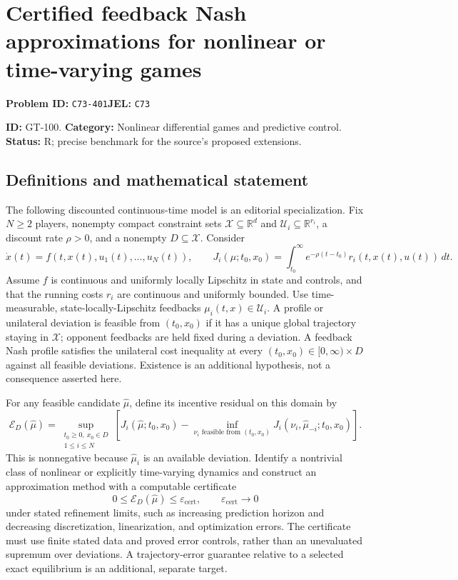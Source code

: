 \documentclass[11pt,a4paper]{article}
\begin{document}
\section*{Certified feedback Nash approximations for nonlinear or time-varying games}
\textbf{Problem ID:} \texttt{C73-401}\quad \textbf{JEL:} \texttt{C73}\par
\label{problem:OP-0230}
\label{game:GT-100}
{\sffamily\small\color{muted}
\noindent\textbf{ID:} GT-100. \textbf{Category:} Nonlinear differential games and predictive control.
\textbf{Status:} R; precise benchmark for the source's proposed extensions.
\par}
\subsection*{Definitions and mathematical statement}
The following discounted continuous-time model is an editorial specialization. Fix $N\geq2$ players, nonempty compact constraint sets $\mathcal X\subseteq\mathbb R^d$ and $\mathcal U_i\subseteq\mathbb R^{r_i}$, a discount rate $\rho>0$, and a nonempty $D\subseteq\mathcal X$. Consider
\[
 \dot x(t)=f(t,x(t),u_1(t),\ldots,u_N(t)),\qquad
 J_i(\mu;t_0,x_0)=\int_{t_0}^\infty e^{-\rho(t-t_0)}
                   r_i(t,x(t),u(t))\,dt.
\]
Assume $f$ is continuous and uniformly locally Lipschitz in state and controls, and that the running costs $r_i$ are continuous and uniformly bounded. Use time-measurable, state-locally-Lipschitz feedbacks $\mu_i(t,x)\in\mathcal U_i$. A profile or unilateral deviation is feasible from $(t_0,x_0)$ if it has a unique global trajectory staying in $\mathcal X$; opponent feedbacks are held fixed during a deviation. A feedback Nash profile satisfies the unilateral cost inequality at every $(t_0,x_0)\in[0,\infty)\times D$ against all feasible deviations. Existence is an additional hypothesis, not a consequence asserted here.

For any feasible candidate $\widehat\mu$, define its incentive residual on this domain by
\[
 \mathcal E_D(\widehat\mu)=
 \sup_{\substack{t_0\geq0,\ x_0\in D\\1\leq i\leq N}}
 \left[J_i(\widehat\mu;t_0,x_0)
   -\inf_{\nu_i\text{ feasible from }(t_0,x_0)}
          J_i(\nu_i,\widehat\mu_{-i};t_0,x_0)\right].
\]
This is nonnegative because $\widehat\mu_i$ is an available deviation. Identify a nontrivial class of nonlinear or explicitly time-varying dynamics and construct an approximation method with a computable certificate
\[
 0\leq\mathcal E_D(\widehat\mu)\leq\varepsilon_{\mathrm{cert}},
 \qquad\varepsilon_{\mathrm{cert}}\longrightarrow0
\]
under stated refinement limits, such as increasing prediction horizon and decreasing discretization, linearization, and optimization errors. The certificate must use finite stated data and proved error controls, rather than an unevaluated supremum over deviations. A trajectory-error guarantee relative to a selected exact equilibrium is an additional, separate target.
\end{document}
